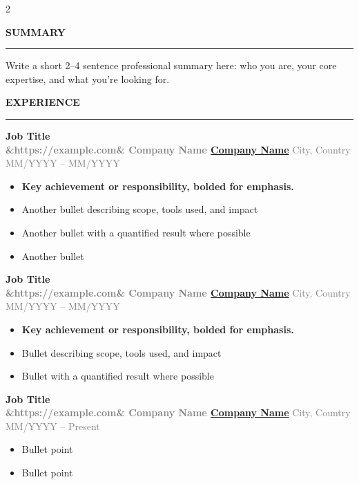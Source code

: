 \documentclass[8pt,a4paper]{article}
\newcommand{\cvsection}[1]{%
  \vspace{10pt}%
  {\Large\bfseries\MakeUppercase{#1}}\\[-8pt]%
  {\rule{\linewidth}{1.5pt}}%
  \vspace{1pt}%
}
\newcommand{\jobtitle}[1]{{\large\bfseries #1}}
\newcommand{\company}[2][]{%
  {\small\bfseries%
  \ifx&#1&%
    \textcolor{accentblue}{#2}%
  \else%
    \href{#1}{\textcolor{accentblue}{#2}}%
  \fi}%
}
\newcommand{\rolenote}[1]{%
  \vspace{1pt}{\footnotesize\textcolor{gray}{\textit{#1}}}\vspace{1pt}%
}
\newcommand{\dateplace}[3]{%
  \vspace{1pt}%
  {\footnotesize\textcolor{gray}{%
    \faBuilding\;#3%
    \hspace{0.5em}%
    \faMapMarker\;#2%
    \hspace{0.5em}%
    \faCalendar\;#1%
  }}%
  \vspace{1pt}%
}
\begin{document}
\setlength{\columnsep}{1.6em}
\sloppy
\begin{paracol}{2}
\RaggedRight

\cvsection{Summary}
Write a short 2--4 sentence professional summary here: who you are, your core expertise, and what you're looking for.

\cvsection{Experience}
\vspace{2pt}
\vspace{4pt}
\jobtitle{Job Title}\\
\dateplace{MM/YYYY -- MM/YYYY}{City, Country}{\company[https://example.com]{Company Name}}
\begin{itemize}
\item \textbf{Key achievement or responsibility, bolded for emphasis.}
  \item Another bullet describing scope, tools used, and impact
  \item Another bullet with a quantified result where possible
  \item Another bullet
\end{itemize}
\vspace{2pt}

\jobtitle{Job Title}\\
\dateplace{MM/YYYY -- MM/YYYY}{City, Country}{\company[https://example.com]{Company Name}}
\begin{itemize}
  \item \textbf{Key achievement or responsibility, bolded for emphasis.}
  \item Bullet describing scope, tools used, and impact
  \item Bullet with a quantified result where possible
\end{itemize}
\vspace{2pt}

\jobtitle{Job Title}\\
\dateplace{MM/YYYY -- Present}{City, Country}{\company[https://example.com]{Company Name}}
\begin{itemize}
  \item Bullet point
  \item Bullet point
\end{itemize}


\end{paracol}
\end{document}
